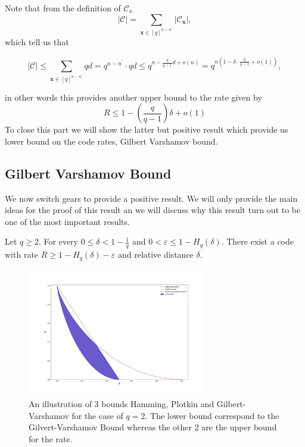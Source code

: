 \indent Note that from the definition of $\mathcal{C}_{x}$
\begin{equation}
|\mathcal{C}|=\sum_{\mathbf{x} \in[q]^{n-n^{\prime}}}\left|\mathcal{C}_{\mathbf{x}}\right|,
\end{equation}
which tell us that 

\begin{equation}
\left.|\mathcal{C}| \leq \sum_{\mathbf{x} \in[q]^{n-n^{\prime}}} q d=q^{n-n^{\prime}} \cdot q d \leq q^{n-\frac{q}{q-1} d+o(n)}=q^{n\left(1-\delta \cdot \frac{q}{q-1}+o(1)\right)}\right.,
\end{equation}

in other words this provides another upper bound to the rate given by
\begin{equation}
R \leq 1-\left(\frac{q}{q-1}\right) \delta+o(1)
\label{CH2:Plotkin:bound_rate}
\end{equation}
\indent To close this part we will show the latter but positive result which provide us  lower bound on the code rates, Gilbert Varshamov bound.
\subsection{Gilbert Varshamov Bound}
We now switch gears to provide a positive result. We will only provide the main ideas for the proof of this result an we will discuss why this result turn out to be one of the most important results.
\begin{definition}
Let $q\geq 2$. For every $0 \leq \delta<1-\frac{1}{q}$ and $0<\varepsilon \leq 1-H_{q}(\delta)$. There exist a code with rate $R \geq 1-H_{q}(\delta)-\varepsilon$ and relative distance $\delta$.
\label{CH2:Definition_Gilbert_Varshamov}
\end{definition}

\begin{figure}
\centering
\includegraphics[width=0.7\textwidth]{Figures/Hamming_plotkin_Gilbert_bound.png}
\caption{An illustration of 3 bounds Hamming, Plotkin and Gilbert-Varshamov for the case of $q=2$. The lower bound correspond to the Gilvert-Varshamov Bound whereas the other 2 are the upper bound for the rate.}
\end{figure}

